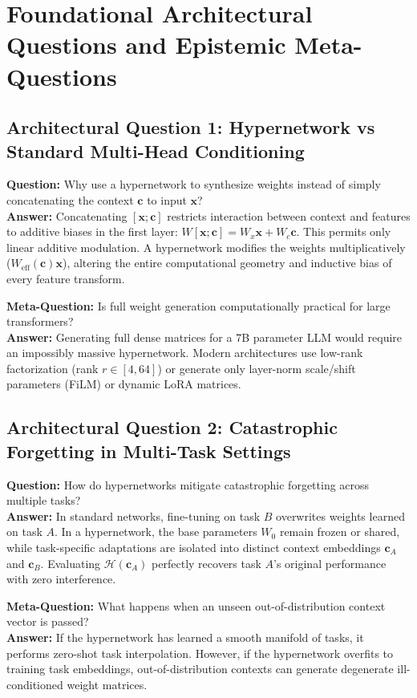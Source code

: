 \documentclass[11pt,a4paper]{article}
\theoremstyle{definition}
\begin{document}
\section{Foundational Architectural Questions and Epistemic Meta-Questions}

\subsection{Architectural Question 1: Hypernetwork vs Standard Multi-Head Conditioning}
\textbf{Question:} Why use a hypernetwork to synthesize weights instead of simply concatenating the context $\mathbf{c}$ to input $\mathbf{x}$?\\
\textbf{Answer:} Concatenating $[\mathbf{x}; \mathbf{c}]$ restricts interaction between context and features to additive biases in the first layer: $W [\mathbf{x}; \mathbf{c}] = W_x \mathbf{x} + W_c \mathbf{c}$. This permits only linear additive modulation. A hypernetwork modifies the weights multiplicatively ($W_{\text{eff}}(\mathbf{c}) \mathbf{x}$), altering the entire computational geometry and inductive bias of every feature transform.

\textbf{Meta-Question:} Is full weight generation computationally practical for large transformers?\\
\textbf{Answer:} Generating full dense matrices for a 7B parameter LLM would require an impossibly massive hypernetwork. Modern architectures use low-rank factorization (rank $r \in [4, 64]$) or generate only layer-norm scale/shift parameters (FiLM) or dynamic LoRA matrices.

\subsection{Architectural Question 2: Catastrophic Forgetting in Multi-Task Settings}
\textbf{Question:} How do hypernetworks mitigate catastrophic forgetting across multiple tasks?\\
\textbf{Answer:} In standard networks, fine-tuning on task $B$ overwrites weights learned on task $A$. In a hypernetwork, the base parameters $W_0$ remain frozen or shared, while task-specific adaptations are isolated into distinct context embeddings $\mathbf{c}_A$ and $\mathbf{c}_B$. Evaluating $\mathcal{H}(\mathbf{c}_A)$ perfectly recovers task $A$'s original performance with zero interference.

\textbf{Meta-Question:} What happens when an unseen out-of-distribution context vector is passed?\\
\textbf{Answer:} If the hypernetwork has learned a smooth manifold of tasks, it performs zero-shot task interpolation. However, if the hypernetwork overfits to training task embeddings, out-of-distribution contexts can generate degenerate ill-conditioned weight matrices.
\end{document}
